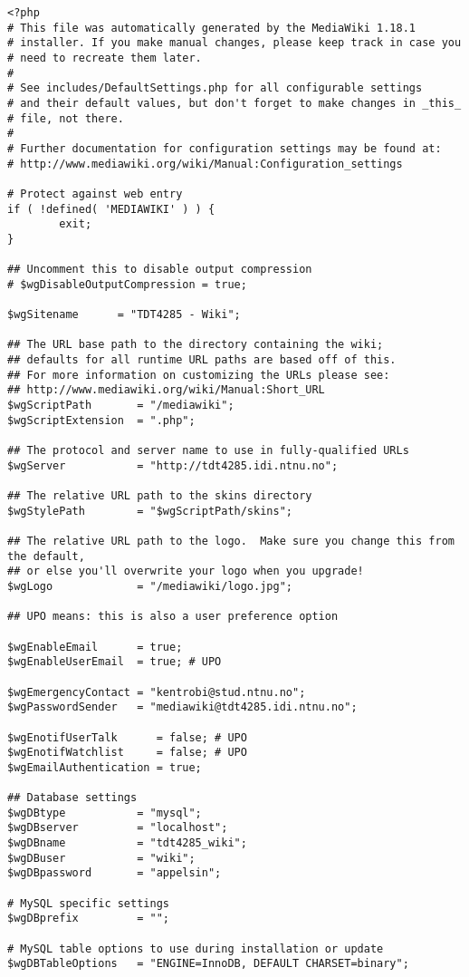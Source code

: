 \begin{lstlisting}
<?php
# This file was automatically generated by the MediaWiki 1.18.1
# installer. If you make manual changes, please keep track in case you
# need to recreate them later.
#
# See includes/DefaultSettings.php for all configurable settings
# and their default values, but don't forget to make changes in _this_
# file, not there.
#
# Further documentation for configuration settings may be found at:
# http://www.mediawiki.org/wiki/Manual:Configuration_settings

# Protect against web entry
if ( !defined( 'MEDIAWIKI' ) ) {
        exit;
}

## Uncomment this to disable output compression
# $wgDisableOutputCompression = true;

$wgSitename      = "TDT4285 - Wiki";

## The URL base path to the directory containing the wiki;
## defaults for all runtime URL paths are based off of this.
## For more information on customizing the URLs please see:
## http://www.mediawiki.org/wiki/Manual:Short_URL
$wgScriptPath       = "/mediawiki";
$wgScriptExtension  = ".php";

## The protocol and server name to use in fully-qualified URLs
$wgServer           = "http://tdt4285.idi.ntnu.no";

## The relative URL path to the skins directory
$wgStylePath        = "$wgScriptPath/skins";

## The relative URL path to the logo.  Make sure you change this from the default,
## or else you'll overwrite your logo when you upgrade!
$wgLogo             = "/mediawiki/logo.jpg";

## UPO means: this is also a user preference option

$wgEnableEmail      = true;
$wgEnableUserEmail  = true; # UPO

$wgEmergencyContact = "kentrobi@stud.ntnu.no";
$wgPasswordSender   = "mediawiki@tdt4285.idi.ntnu.no";

$wgEnotifUserTalk      = false; # UPO
$wgEnotifWatchlist     = false; # UPO
$wgEmailAuthentication = true;

## Database settings
$wgDBtype           = "mysql";
$wgDBserver         = "localhost";
$wgDBname           = "tdt4285_wiki";
$wgDBuser           = "wiki";
$wgDBpassword       = "appelsin";

# MySQL specific settings
$wgDBprefix         = "";

# MySQL table options to use during installation or update
$wgDBTableOptions   = "ENGINE=InnoDB, DEFAULT CHARSET=binary";


\end{lstlisting}
